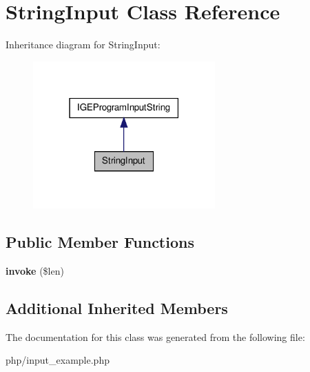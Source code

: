 \hypertarget{class_string_input}{\section{String\-Input Class Reference}
\label{class_string_input}
}


Inheritance diagram for String\-Input\-:
\nopagebreak
\begin{figure}[H]
\begin{center}
\leavevmode
\includegraphics[width=198pt]{class_string_input__inherit__graph}
\end{center}
\end{figure}
\subsection*{Public Member Functions}
\begin{DoxyCompactItemize}
\item 
\hypertarget{class_string_input_a640b8886223cba5b5bf1b49cf5623a73}{{\bfseries invoke} (\$len)}\label{class_string_input_a640b8886223cba5b5bf1b49cf5623a73}

\end{DoxyCompactItemize}
\subsection*{Additional Inherited Members}


The documentation for this class was generated from the following file\-:\begin{DoxyCompactItemize}
\item 
php/input\-\_\-example.\-php\end{DoxyCompactItemize}
